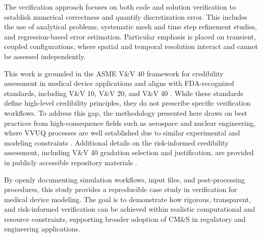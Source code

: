 The verification approach focuses on both code and solution verification to establish numerical correctness and quantify discretization error. This includes the use of analytical problems, systematic mesh and time step refinement studies, and regression-based error estimation. Particular emphasis is placed on transient, coupled configurations, where spatial and temporal resolution interact and cannot be assessed independently.

This work is grounded in the ASME V\&V 40 framework for credibility assessment in medical device applications and aligns with FDA-recognized standards, including V\&V 10, V\&V 20, and V\&V 40 \cite{vv10, vv20, vv40, pathmanathanAA, vv10_fdarecognized, vv20_fdarecognized, vv40_fdarecognized, fda_guidance_2023}. While these standards define high-level credibility principles, they do not prescribe specific verification workflows. To address this gap, the methodology presented here draws on best practices from high-consequence fields such as aerospace and nuclear engineering, where VVUQ processes are well established due to similar experimental and modeling constraints \cite{OberkampfRoy2013, Roache2009, AIAA-G-077-1998}. Additional details on the risk-informed credibility assessment, including V\&V 40 gradation selection and justification, are provided in publicly accessible repository materials \cite{edds_credibility_repo}.

By openly documenting simulation workflows, input files, and post-processing procedures, this study provides a reproducible case study in verification for medical device modeling. The goal is to demonstrate how rigorous, transparent, and risk-informed verification can be achieved within realistic computational and resource constraints, supporting broader adoption of CM\&S in regulatory and engineering applications.
